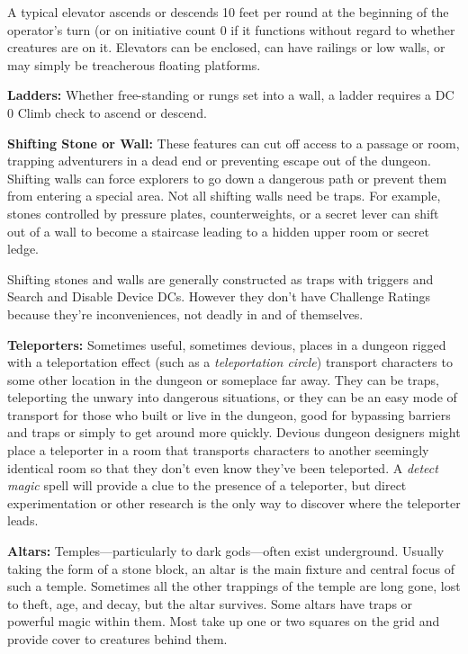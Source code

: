 \documentclass{article}
\begin{document}
A typical elevator ascends or descends 10 feet per round at the beginning of the 
operator's turn (or on initiative count 0 if it functions without regard to whether 
creatures are on it. Elevators can be enclosed, can have railings or low walls, 
or may simply be treacherous floating platforms.

\textbf{Ladders:} Whether free-standing or rungs set into a wall, a ladder requires 
a DC 0 Climb check to ascend or descend.

\textbf{Shifting Stone or Wall: }These features can cut off access to a passage 
or room, trapping adventurers in a dead end or preventing escape out of the dungeon. 
Shifting walls can force explorers to go down a dangerous path or prevent them 
from entering a special area. Not all shifting walls need be traps. For example, 
stones controlled by pressure plates, counterweights, or a secret lever can shift 
out of a wall to become a staircase leading to a hidden upper room or secret ledge.

Shifting stones and walls are generally constructed as traps with triggers and 
Search and Disable Device DCs. However they don't have Challenge Ratings because 
they're inconveniences, not deadly in and of themselves.

\textbf{Teleporters:} Sometimes useful, sometimes devious, places in a dungeon 
rigged with a teleportation effect (such as a \textit{teleportation circle}) transport 
characters to some other location in the dungeon or someplace far away. They can 
be traps, teleporting the unwary into dangerous situations, or they can be an easy 
mode of transport for those who built or live in the dungeon, good for bypassing 
barriers and traps or simply to get around more quickly. Devious dungeon designers 
might place a teleporter in a room that transports characters to another seemingly 
identical room so that they don't even know they've been teleported. A \textit{detect 
magic }spell will provide a clue to the presence of a teleporter, but direct experimentation 
or other research is the only way to discover where the teleporter leads.

\textbf{Altars:} Temples---particularly to dark gods---often exist underground. 
Usually taking the form of a stone block, an altar is the main fixture and central 
focus of such a temple. Sometimes all the other trappings of the temple are long 
gone, lost to theft, age, and decay, but the altar survives. Some altars have traps 
or powerful magic within them. Most take up one or two squares on the grid and 
provide cover to creatures behind them. 
\end{document}
